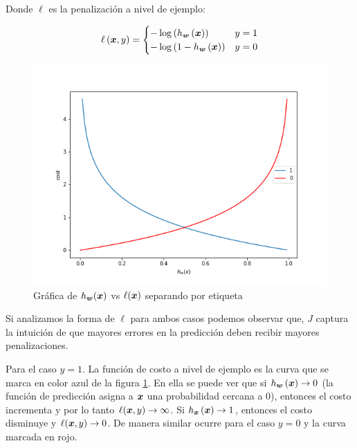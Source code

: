 Donde $\ell$ es la penalización a nivel de ejemplo:

\begin{align}
    \ell\left( \boldsymbol{x}, y \right) =
    \begin{cases}
        - \log\left( h_{\boldsymbol{w}}\left( \boldsymbol{x} \right) \right) & y = 1 \\
        - \log\left(1 - h_{\boldsymbol{w}}\left( \boldsymbol{x} \right) \right) & y = 0
    \end{cases}
\end{align}

\begin{figure}
    \centering
    \includegraphics[scale=0.5]{figures/logistic_regression_loss.png}
    \caption{Gráfica de $h_{\boldsymbol{w}}(\boldsymbol{x})$ vs $\ell(\boldsymbol{x})$ separando
    por etiqueta}
    \label{fig:lgr_loss}
\end{figure}

Si analizamos la forma de $\ell$ para ambos casos podemos observar que, $J$
captura la intuición de que mayores errores en la predicción deben recibir
mayores penalizaciones.

Para el caso $y = 1$. La función de costo a nivel de ejemplo es la curva que se
marca en color azul de la figura \ref{fig:lgr_loss}. En ella se puede ver que si
$h_{\boldsymbol{w}}\left( \boldsymbol{x} \right) \rightarrow 0$ (la función de predicción
asigna a $\boldsymbol{x}$ una probabilidad cercana a $0$), entonces el costo
incrementa y por lo tanto $\ell(\boldsymbol{x}, y) \rightarrow \infty$. Si
$h_{\boldsymbol{x}}\left( \boldsymbol{x} \right) \rightarrow 1$, entonces el costo disminuye
y $\ell(\boldsymbol{x}, y) \rightarrow 0$. De manera similar ocurre para el caso $y =
0$ y la curva marcada en rojo.

